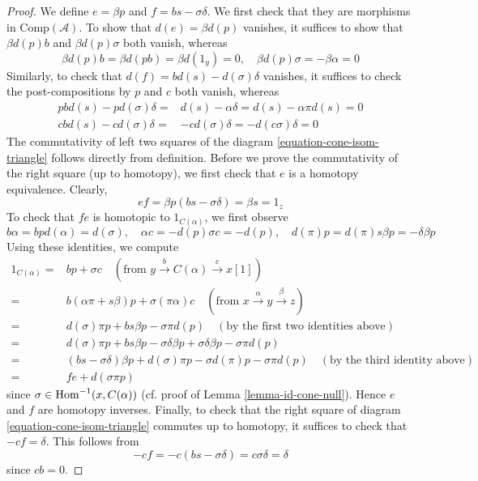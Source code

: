 \begin{proof}
\medskip\noindent
We define $e=\beta p$ and $f=bs-\sigma\delta$. We first check that they are
morphisms in $\text{Comp}(\mathcal{A})$. To show that $d(e)=\beta d(p)$
vanishes, it suffices to show that $\beta d(p)b$ and $\beta d(p)\sigma$
both vanish, whereas
$$
\beta d(p)b = \beta d(pb) = \beta d(1_y) = 0,\quad
\beta d(p)\sigma = -\beta\alpha = 0
$$
Similarly, to check that $d(f)=bd(s)-d(\sigma)\delta$ vanishes,
it suffices to check the post-compositions by $p$ and $c$ both vanish,
whereas
\begin{align*}
pbd(s) - pd(\sigma)\delta
= &
d(s)-\alpha\delta = d(s)-\alpha\pi d(s) = 0 \\
cbd(s)-cd(\sigma)\delta
= &
-cd(\sigma)\delta = -d(c\sigma)\delta = 0
\end{align*}
The commutativity of left two squares of the
diagram \ref{equation-cone-isom-triangle} follows directly from definition.
Before we prove the commutativity of the right square (up to homotopy),
we first check that $e$ is a homotopy equivalence. Clearly,
$$
ef=\beta p (bs-\sigma\delta)=\beta s=1_z
$$
To check that $fe$ is homotopic to $1_{C(\alpha)}$, we first observe
$$
b\alpha = bpd(\alpha) = d(\sigma),\quad
\alpha c = -d(p)\sigma c = -d(p),\quad
d(\pi)p = d(\pi)s\beta p = -\delta\beta p
$$
Using these identities, we compute
\begin{align*}
1_{C(\alpha)} = &
bp + \sigma c
\quad (\text{from }y \xrightarrow{b} C(\alpha) \xrightarrow{c} x[1]) \\
= &
b(\alpha\pi + s\beta)p + \sigma(\pi\alpha)c
\quad (\text{from }x \xrightarrow{\alpha} y \xrightarrow{\beta} z) \\
= &
d(\sigma)\pi p + bs\beta p - \sigma\pi d(p)
\quad (\text{by the first two identities above}) \\
= &
d(\sigma)\pi p + bs\beta p - \sigma\delta\beta p
+ \sigma\delta\beta p - \sigma\pi d(p) \\
= &
(bs - \sigma\delta)\beta p + d(\sigma)\pi p
- \sigma d(\pi)p - \sigma\pi d(p)\quad
(\text{by the third identity above}) \\
= &
fe + d(\sigma \pi p)
\end{align*}
since $\sigma \in \mathop{\mathrm{Hom}}\nolimits^{-1}(x, C(\alpha))$
(cf. proof of Lemma \ref{lemma-id-cone-null}).
Hence $e$ and $f$ are homotopy inverses.
Finally, to check that the right square of
diagram \ref{equation-cone-isom-triangle} commutes up to homotopy,
it suffices to check that $-cf=\delta$. This follows from
$$
-cf = -c(bs-\sigma\delta) = c\sigma\delta = \delta
$$
since $cb=0$.


\end{proof}
